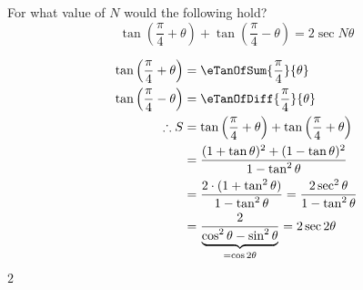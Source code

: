 

\question[3] For what value of $N$ would the following hold? 
\[ \tan\left(\dfrac{\pi}{4} + \theta\right) + \tan\left(\dfrac{\pi}{4} - \theta\right) = 2\sec N\theta \]


\ifprintanswers
\fi 

\begin{solution}[\halfpage]
	\begin{align}
    \tan\left(\dfrac\pi{4}+\theta\right) &= \eTanOfSum{\frac\pi{4}}{\theta} \\
    \tan\left(\dfrac\pi{4}-\theta\right) &= \eTanOfDiff{\frac\pi{4}}{\theta} \\
		\therefore S &= \tan\left( \dfrac\pi{4}+\theta\right) + \tan\left( \dfrac\pi{4}+\theta\right) \\
    &= \dfrac{(1+\tan\theta)^2 + (1-\tan\theta)^2}{1-\tan^2\theta} \\
		&= \dfrac{2\cdot(1 + \tan^2\theta)}{1-\tan^2\theta} = \dfrac{2\sec^2\theta}{1-\tan^2\theta} \\
    &= \dfrac{2}{\underbrace{\cos^2\theta - \sin^2\theta}_{ = \cos 2\theta}} = 2\sec 2\theta
	\end{align}
\end{solution}
\ifprintanswers\begin{codex}$2$\end{codex}\fi
